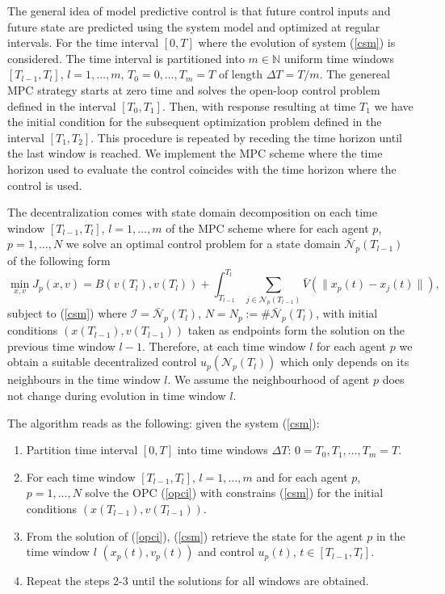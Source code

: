 \documentclass[a4paper,10pt, english]{article}
\begin{document}
 The general idea of model predictive control is that future control inputs and future state are predicted using the system model and optimized at regular intervals. For
 the time interval $[0, T]$ where the evolution of system (\ref{csm}) is considered. 
 The time interval is partitioned into $m\in \mathbb{N}$ uniform time windows $[T_{l-1}, T_{l}]$, $l = 1, \dots, m$, $T_0 = 0, \dots, T_m = T$  of length  $\Delta T = T/m$. The genereal MPC strategy starts at zero time and solves the open-loop control problem defined in the interval $[T_0, T_1]$. Then, with response  resulting at time $T_1$ we have the initial condition for the subsequent optimization problem defined in the interval $[T_1, T_2]$. This procedure is repeated by receding the time horizon until the last window is reached. We implement the MPC scheme where the time horizon used to evaluate the control coincides with the time horizon where the control is used.
 
 The decentralization comes with state domain decomposition on each time window $[T_{l-1}, T_{l}]$, $l = 1, \dots, m$  of the MPC scheme where for each agent $p$, $p = 1, \dots, N$ we solve an optimal control problem for a state domain $\bar{\mathcal{N}}_p(T_{l-1})$ of the following form
  \begin{equation}
  \min_{x, v} J_p(x, v) = B(v(T_l), v(T_l)) + \int_{T_{l-1}}^{T_l}\sum_{j\in \mathcal{N}_p(T_{l-1})} \bar{V}(\|x_p(t) - x_j(t)\|),
 \label{opci}
 \end{equation}
 subject to (\ref{csm}) where $\mathcal{I} = \bar{\mathcal{N}}_p(T_l)$,  $N = N_p:= \# \bar{\mathcal{N}}_p(T_l)$, with initial conditions $(x(T_{l-1}), v(T_{l-1}))$ taken as endpoints form the solution on the previous time window $l-1$.
 Therefore, at each time window $l$ for each agent $p$ we obtain a suitable decentralized control $u_p(\mathcal{N}_p(T_l))$ which only depends on its neighbours in the time window $l$.
We assume the neighbourhood of agent $p$ does not change during evolution in time window $l$.

   The algorithm reads as the following: given the system (\ref{csm}):
   \begin{enumerate}
   \item Partition time interval $[0, T]$ into time windows $\Delta T$: $0 = T_0, T_1, \dots, T_m = T$.
   \item For each time window  $[T_{l-1}, T_{l}]$, $l = 1, \dots, m$ and for each agent $p$, $p = 1, \dots, N$  solve the OPC (\ref{opci}) with constrains (\ref{csm}) for the initial conditions $(x(T_{l-1}), v(T_{l-1}))$.
   \item From the solution of (\ref{opci}), (\ref{csm})  retrieve the  state for the agent $p$ in the time window $l$ $(x_p(t), v_p(t))$ and control $u_p(t)$, $t\in [T_{l-1}, T_{l}]$.
   \item Repeat the steps 2-3 until the solutions for all windows are obtained. 
 \end{enumerate}
 
\end{document}
